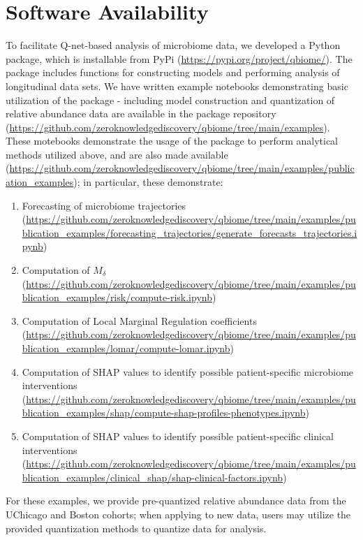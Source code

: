 \documentclass[onecolumn,10pt]{IEEEtran}
\def\qnet{Q-net\xspace}
\def\erisk{$M_\delta$\xspace}
\begin{document}
\section{Software Availability}

To facilitate \qnet-based analysis of microbiome data, we developed a  Python package, which is installable from PyPi (\url{https://pypi.org/project/qbiome/}). The package includes functions for constructing models and performing analysis of longitudinal data sets.  We have written example notebooks demonstrating basic utilization of the package - including model construction and quantization of relative abundance data are available in the package repository (\url{https://github.com/zeroknowledgediscovery/qbiome/tree/main/examples}). These motebooks demonstrate the usage of the package to perform analytical methods utilized above, and  are also made available (\url{https://github.com/zeroknowledgediscovery/qbiome/tree/main/examples/publication_examples}); in particular, these demonstrate:
\begin{enumerate}
    \item Forecasting of microbiome trajectories (\url{https://github.com/zeroknowledgediscovery/qbiome/tree/main/examples/publication_examples/forecasting_trajectories/generate_forecasts_trajectories.ipynb})
    \item Computation of \erisk (\url{https://github.com/zeroknowledgediscovery/qbiome/tree/main/examples/publication_examples/risk/compute-risk.ipynb})
    \item Computation of Local Marginal Regulation coefficients (\url{https://github.com/zeroknowledgediscovery/qbiome/tree/main/examples/publication_examples/lomar/compute-lomar.ipynb})
    \item Computation of SHAP values to identify possible patient-specific microbiome interventions (\url{https://github.com/zeroknowledgediscovery/qbiome/tree/main/examples/publication_examples/shap/compute-shap-profiles-phenotypes.ipynb})
    \item Computation of SHAP values to identify possible patient-specific clinical interventions (\url{https://github.com/zeroknowledgediscovery/qbiome/tree/main/examples/publication_examples/clinical_shap/shap-clinical-factors.ipynb})
\end{enumerate}
For these examples, we provide pre-quantized relative abundance data from the UChicago and Boston cohorts; when applying to new data, users may utilize the provided quantization methods to quantize data for analysis.
\end{document}
